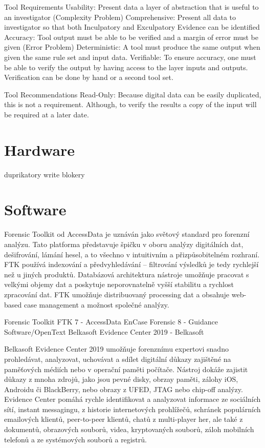 \documentclass[thesis=B,czech]{FITthesis}[2012/06/26]
\begin{document}
Tool Requirements \cite{for_need}
 Usability: Present data a layer of abstraction that is useful
to an investigator (Complexity Problem)
Comprehensive: Present all data to investigator so that both
Inculpatory and Exculpatory Evidence can be identified
 Accuracy: Tool output must be able to be verified and a
margin of error must be given (Error Problem)
 Deterministic: A tool must produce the same output when
given the same rule set and input data.
 Verifiable: To ensure accuracy, one must be able to verify
the output by having access to the layer inputs and outputs.
 Verification can be done by hand or a second tool set.

Tool Recommendations
 Read-Only: Because digital data can be easily duplicated,
this is not a requirement. Although, to verify the results a
copy of the input will be required at a later date.


\section{Hardware}
duprikatory
write blokery


\section{Software}
Forensic Toolkit od AccessData je uznáván jako světový standard pro forenzní analýzu. Tato platforma představuje špičku v oboru analýzy digitálních dat, dešifrování, lámání hesel, a to všechno v intuitivním a přizpůsobitelném rozhraní. FTK používá indexování a předvyhledávání – filtrování výsledků je tedy rychlejší než u jiných produktů. Databázová architektura nástroje umožňuje pracovat s velkými objemy dat a poskytuje neporovnatelně vyšší stabilitu a rychlost zpracování dat. FTK umožňuje distribuovaný processing dat a obsahuje web-based case management a možnost společné analýzy.

\cite{for_soft}

Forensic Toolkit FTK 7 - AccessData
EnCase Forensic 8 - Guidance Software/OpenText
Belkasoft Evidence Center 2019 - Belkasoft
      
Belkasoft Evidence Center 2019 umožňuje forenznímu expertovi snadno prohledávat, analyzovat, uchovávat a sdílet digitální důkazy zajištěné na paměťových médiích nebo v operační paměti počítače. Nástroj dokáže zajistit důkazy z mnoha zdrojů, jako jsou pevné disky, obrzay paměti, zálohy iOS, Androidu či BlackBerry, nebo obrazy z UFED, JTAG nebo chip-off analýzy. Evidence Center pomáhá rychle identifikovat a analyzovat informace ze sociálních sítí, instant messagingu, z historie internetových prohlížečů, schránek populárních emailových klientů, peer-to-peer klientů, chatů z multi-player her, ale také z dokumentů, obrazových souborů, videa, kryptovaných souborů, záloh mobilních telefonů a ze systémových souborů a registrů.
\end{document}
